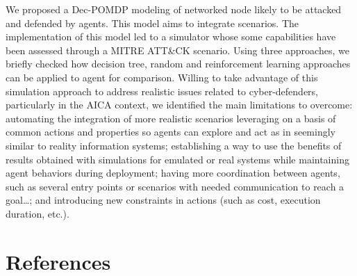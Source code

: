 \documentclass[conference]{IEEEtran}
\begin{document}
\noindent
We proposed a Dec-POMDP modeling of networked node likely to be attacked and defended by agents. This model aims to integrate scenarios. The implementation of this model led to a simulator whose some capabilities have been assessed through a MITRE ATT\&CK scenario. Using three approaches, we briefly checked how decision tree, random and reinforcement learning approaches can be applied to agent for comparison.
Willing to take advantage of this simulation approach to address realistic issues related to cyber-defenders, particularly in the AICA context, we identified the main limitations to overcome:
automating the integration of more realistic scenarios leveraging on a basis of common actions and properties so agents can explore and act as in seemingly similar to reality information systems;
establishing a way to use the benefits of results obtained with simulations for emulated or real systems while maintaining agent behaviors during deployment;
having more coordination between agents, such as several entry points or scenarios with needed communication to reach a goal\dots;
and introducing new constraints in actions (such as cost, execution duration, etc.).


\section*{References}

% 



\end{document}
